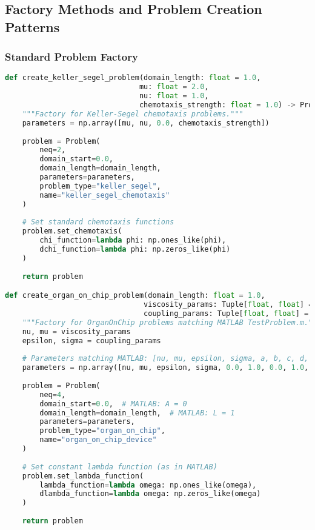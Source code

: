 \subsection{Factory Methods and Problem Creation Patterns}
\label{subsec:problem_factories}

\subsubsection{Standard Problem Factory}

\begin{lstlisting}[language=Python, caption=Problem Factory Functions]
def create_keller_segel_problem(domain_length: float = 1.0,
                               mu: float = 2.0,
                               nu: float = 1.0,
                               chemotaxis_strength: float = 1.0) -> Problem:
    """Factory for Keller-Segel chemotaxis problems."""
    parameters = np.array([mu, nu, 0.0, chemotaxis_strength])
    
    problem = Problem(
        neq=2,
        domain_start=0.0,
        domain_length=domain_length,
        parameters=parameters,
        problem_type="keller_segel",
        name="keller_segel_chemotaxis"
    )
    
    # Set standard chemotaxis functions
    problem.set_chemotaxis(
        chi_function=lambda phi: np.ones_like(phi),
        dchi_function=lambda phi: np.zeros_like(phi)
    )
    
    return problem

def create_organ_on_chip_problem(domain_length: float = 1.0,
                                viscosity_params: Tuple[float, float] = (1.0, 2.0),
                                coupling_params: Tuple[float, float] = (1.0, 1.0)) -> Problem:
    """Factory for OrganOnChip problems matching MATLAB TestProblem.m."""
    nu, mu = viscosity_params
    epsilon, sigma = coupling_params
    
    # Parameters matching MATLAB: [nu, mu, epsilon, sigma, a, b, c, d, chi]
    parameters = np.array([nu, mu, epsilon, sigma, 0.0, 1.0, 0.0, 1.0, 1.0])
    
    problem = Problem(
        neq=4,
        domain_start=0.0,  # MATLAB: A = 0
        domain_length=domain_length,  # MATLAB: L = 1
        parameters=parameters,
        problem_type="organ_on_chip",
        name="organ_on_chip_device"
    )
    
    # Set constant lambda function (as in MATLAB)
    problem.set_lambda_function(
        lambda_function=lambda omega: np.ones_like(omega),
        dlambda_function=lambda omega: np.zeros_like(omega)
    )
    
    return problem
\end{lstlisting}

